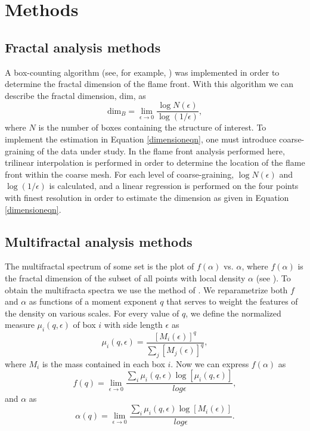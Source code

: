 \documentclass[iop]{emulateapj}
\begin{document}
\section{Methods}\label{Methods}

\subsection{Fractal analysis methods}\label{FractalMethods}
A box-counting algorithm (see, for example, \cite{Falconer2003}) was implemented in order to determine the fractal dimension of the flame front. With this algorithm we can describe the fractal dimension, $\mathrm{dim}$, as
\begin{equation}\label{dimensioneqn}
	\mathrm{dim}_B = \lim_{\epsilon \to 0} \frac{\log N(\epsilon)}{\log (1 / \epsilon)},
\end{equation}
where $N$ is the number of boxes containing the structure of interest.  To implement the estimation in Equation \ref{dimensioneqn}, one must introduce coarse-graining of the data under study. In the flame front analysis performed here, trilinear interpolation is performed in order to determine the location of the flame front within the coarse mesh. For each level of coarse-graining, $\log{N(\epsilon)}$ and $\log{(1/\epsilon)}$ is calculated, and a linear regression is performed on the four points with finest resolution in order to estimate the dimension as given in Equation \ref{dimensioneqn}.

\subsection{Multifractal analysis methods}\label{MultifractalMethods}
The multifractal spectrum of some set is the plot of $f(\alpha)$ vs. $\alpha$, where $f(\alpha)$ is the fractal dimension of the subset of all points with local density $\alpha$ (see \cite{Falconer2006}). To obtain the multifracta spectra we use the method of \cite{Chhabra1989}. We reparametrize both $f$ and $\alpha$ as functions of a moment exponent $q$ that serves to weight the features of the density on various scales. For every value of $q$, we define the normalized measure $\mu_i(q, \epsilon)$ of box $i$ with side length $\epsilon$ as
\begin{equation} 
	\mu_i(q, \epsilon) = \frac{[M_i(\epsilon)]^q}{\sum_j[M_j(\epsilon)]^q},
\end{equation}
where $M_i$ is the mass contained in each box $i$. Now we can express $f(\alpha)$ as
\begin{equation}
	f(q) = \lim_{\epsilon \to 0} \frac{\sum_i \mu_i(q, \epsilon) \log[\mu_i(q, \epsilon)]}{log \epsilon},
\end{equation}
and $\alpha$ as
\begin{equation}
	\alpha (q) = \lim_{\epsilon \to 0} \frac{\sum_i \mu_i(q, \epsilon) \log[M_i(\epsilon)]}{log \epsilon}.
\end{equation}
\end{document}
